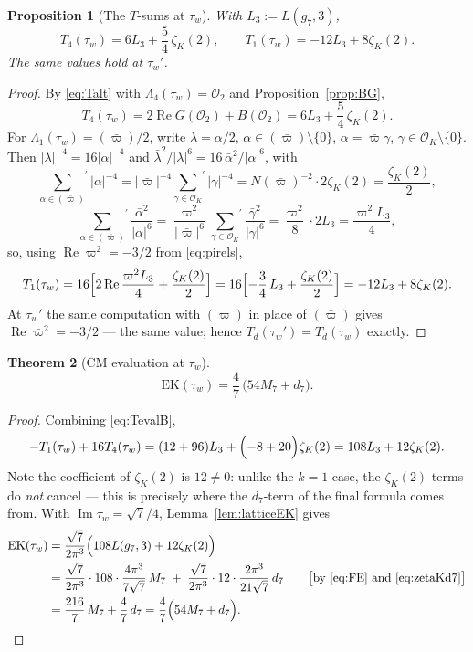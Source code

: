 \documentclass[11pt]{article}
\newtheorem{theorem}{Theorem}[section]
\newtheorem{proposition}[theorem]{Proposition}
\theoremstyle{definition}
\theoremstyle{remark}
\newcommand{\cL}{\Lambda}
\newcommand{\ImT}{\operatorname{Im}}
\newcommand{\ReT}{\operatorname{Re}}
\newcommand{\OO}{\mathcal{O}}
\begin{document}
\begin{proposition}[The $T$-sums at $\tau_w$]\label{prop:TevalB}
With $L_3:=L(g_7,3)$,
\begin{equation}\label{eq:TevalB}
  T_4(\tau_w)=6L_3+\frac54\,\zeta_K(2),\qquad
  T_1(\tau_w)=-12L_3+8\zeta_K(2).
\end{equation}
The same values hold at $\tau_w'$.
\end{proposition}
\begin{proof}
By \eqref{eq:Talt} with $\cL_4(\tau_w)=\OO_2$ and
Proposition~\ref{prop:BG},
\[
  T_4(\tau_w)=2\ReT G(\OO_2)+B(\OO_2)=6L_3+\frac54\,\zeta_K(2).
\]
For $\cL_1(\tau_w)=(\bar\varpi)/2$, write $\lambda=\alpha/2$,
$\alpha\in(\bar\varpi)\setminus\{0\}$, $\alpha=\bar\varpi\gamma$,
$\gamma\in\OO_K\setminus\{0\}$. Then $|\lambda|^{-4}=16|\alpha|^{-4}$ and
$\bar\lambda^2/|\lambda|^6=16\,\bar\alpha^2/|\alpha|^6$, with
\[
  {\sum_{\alpha\in(\bar\varpi)}}^{\!\prime}|\alpha|^{-4}
  =|\bar\varpi|^{-4}{\sum_{\gamma\in\OO_K}}^{\!\prime}|\gamma|^{-4}
  =N(\bar\varpi)^{-2}\cdot2\zeta_K(2)=\frac{\zeta_K(2)}2,
\]
\[
  {\sum_{\alpha\in(\bar\varpi)}}^{\!\prime}\frac{\bar\alpha^2}{|\alpha|^6}
  =\frac{\varpi^2}{|\bar\varpi|^6}
   {\sum_{\gamma\in\OO_K}}^{\!\prime}\frac{\bar\gamma^2}{|\gamma|^6}
  =\frac{\varpi^2}{8}\cdot2L_3=\frac{\varpi^2L_3}4 ,
\]
so, using $\ReT\varpi^2=-3/2$ from \eqref{eq:pirels},
\[
  T_1(\tau_w)
  =16\Bigl[2\ReT\frac{\varpi^2L_3}4+\frac{\zeta_K(2)}2\Bigr]
  =16\Bigl[-\frac34\,L_3+\frac{\zeta_K(2)}2\Bigr]
  =-12L_3+8\zeta_K(2).
\]
At $\tau_w'$ the same computation with $(\varpi)$ in place of $(\bar\varpi)$
gives $\ReT\bar\varpi^2=-3/2$ --- the same value; hence
$T_d(\tau_w')=T_d(\tau_w)$ exactly.
\end{proof}

\begin{theorem}[CM evaluation at $\tau_w$]\label{thm:P1B}
\[
  \mathrm{EK}(\tau_w)=\frac47\,\bigl(54M_7+d_7\bigr).
\]
\end{theorem}
\begin{proof}
Combining \eqref{eq:TevalB},
\begin{equation}\label{eq:combinationB}
  -T_1(\tau_w)+16T_4(\tau_w)
  =(12+96)L_3+\Bigl(-8+20\Bigr)\zeta_K(2)
  =108L_3+12\zeta_K(2).
\end{equation}
Note the coefficient of $\zeta_K(2)$ is $12\neq0$: unlike the $k=1$ case,
the $\zeta_K(2)$-terms do \emph{not} cancel --- this is precisely where
the $d_7$-term of the final formula comes from. With
$\ImT\tau_w=\sqrt7/4$, Lemma~\ref{lem:latticeEK} gives
\begin{align*}
  \mathrm{EK}(\tau_w)
  &=\frac{\sqrt7}{2\pi^3}\Bigl(108L(g_7,3)+12\zeta_K(2)\Bigr)\\
  &=\frac{\sqrt7}{2\pi^3}\cdot108\cdot\frac{4\pi^3}{7\sqrt7}\,M_7
   \;+\;\frac{\sqrt7}{2\pi^3}\cdot12\cdot\frac{2\pi^3}{21\sqrt7}\,d_7
   \qquad\bigl[\text{by \eqref{eq:FE} and \eqref{eq:zetaKd7}}\bigr]\\
  &=\frac{216}{7}\,M_7+\frac47\,d_7
   =\frac47\Bigl(54M_7+d_7\Bigr). \qedhere
\end{align*}
\end{proof}
\end{document}
